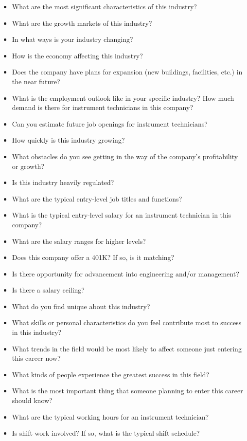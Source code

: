 \begin{itemize}
\begin{itemize}
\item{} What are the most significant characteristics of this industry?
\item{} What are the growth markets of this industry?
\item{} In what ways is your industry changing?
\item{} How is the economy affecting this industry?
\item{} Does the company have plans for expansion (new buildings, facilities, etc.) in the near future?
\item{} What is the employment outlook like in your specific industry?  How much demand is there for instrument technicians in this company?
\item{} Can you estimate future job openings for instrument technicians?
\item{} How quickly is this industry growing?
\item{} What obstacles do you see getting in the way of the company's profitability or growth?
\item{} Is this industry heavily regulated?
\item{} What are the typical entry-level job titles and functions?
\item{} What is the typical entry-level salary for an instrument technician in this company?
\item{} What are the salary ranges for higher levels?
\item{} Does this company offer a 401K?  If so, is it matching?
\item{} Is there opportunity for advancement into engineering and/or management?
\item{} Is there a salary ceiling?
\item{} What do you find unique about this industry?
\item{} What skills or personal characteristics do you feel contribute most to success in this industry?
\item{} What trends in the field would be most likely to affect someone just entering this career now?
\item{} What kinds of people experience the greatest success in this field?
\item{} What is the most important thing that someone planning to enter this career should know?
\item{} What are the typical working hours for an instrument technician?
\item{} Is shift work involved?  If so, what is the typical shift schedule?

\end{itemize}
\end{itemize}
